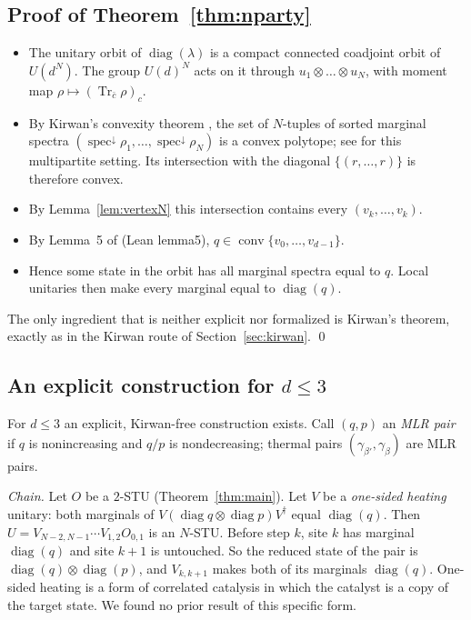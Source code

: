 \documentclass[11pt]{amsart}
\theoremstyle{definition}
\theoremstyle{remark}
\numberwithin{equation}{section}
\newcommand{\Tr}{\operatorname{Tr}}
\newcommand{\diag}{\operatorname{diag}}
\providecommand{\spec}{\operatorname{spec}}
\newcommand{\conv}{\operatorname{conv}}
\newcommand{\leanus}{\textunderscore\allowbreak}
\newcommand{\lean}[1]{{\ttfamily\let\_\leanus #1}}
\begin{document}
\subsection{Proof of Theorem~\ref{thm:nparty}}
\begin{itemize}
\item The unitary orbit of $\diag(\lambda)$ is a compact connected coadjoint orbit of $U(d^N)$. The group $U(d)^N$
acts on it through $u_1\otimes\dots\otimes u_N$, with moment map $\rho\mapsto(\Tr_{\bar c}\rho)_{c}$.
\item By Kirwan's convexity theorem \cite{Kirwan1984}, the set of $N$-tuples of sorted marginal spectra
$(\spec^\downarrow\rho_1,\dots,\spec^\downarrow\rho_N)$ is a convex polytope; see \cite{ChristandlDKW2014} for this
multipartite setting. Its intersection with the diagonal $\{(r,\dots,r)\}$ is therefore convex.
\item By Lemma~\ref{lem:vertexN} this intersection contains every $(v_k,\dots,v_k)$.
\item By Lemma~5 of \cite{BakhshinezhadEtAl2019} (Lean \lean{lemma5}), $q\in\conv\{v_0,\dots,v_{d-1}\}$.
\item Hence some state in the orbit has all marginal spectra equal to $q$. Local unitaries then make every marginal
equal to $\diag(q)$.
\end{itemize}
The only ingredient that is neither explicit nor formalized is Kirwan's theorem, exactly as in the Kirwan route of
Section~\ref{sec:kirwan}. \qed

\subsection{An explicit construction for $d\le3$}
For $d\le3$ an explicit, Kirwan-free construction exists. Call $(q,p)$ an \emph{MLR pair} if $q$ is nonincreasing and
$q/p$ is nondecreasing; thermal pairs $(\gamma_{\beta'},\gamma_\beta)$ are MLR pairs.

\emph{Chain.} Let $O$ be a $2$-STU (Theorem~\ref{thm:main}). Let $V$ be a \emph{one-sided heating} unitary: both
marginals of $V(\diag q\otimes\diag p)V^\dagger$ equal $\diag(q)$. Then $U=V_{N-2,N-1}\cdots V_{1,2}O_{0,1}$ is an
$N$-STU. Before step $k$, site $k$ has marginal $\diag(q)$ and site $k+1$ is untouched. So the reduced state of the
pair is $\diag(q)\otimes\diag(p)$, and $V_{k,k+1}$ makes both of its marginals $\diag(q)$. One-sided heating is a
form of correlated catalysis \cite{Boes2019,ShiraishiSagawa2021,Wilming2022} in which the catalyst is a copy of the
target state. We found no prior result of this specific form.
\end{document}
